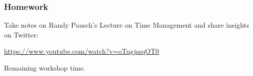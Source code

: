 
\begin{frame}
	\frametitle{Homework}
	
	Take notes on Randy Pausch's Lecture on Time Management and share insights on Twitter:
	
	\vspace{2em}
	
	\url{https://www.youtube.com/watch?v=oTugjssqOT0}
	
	\vspace{2em}
	
	Remaining workshop time.
	
\end{frame}

